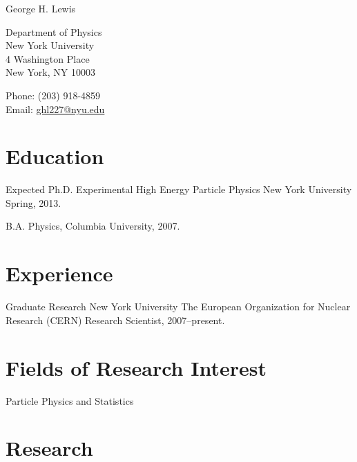 \documentclass[10pt,letterpaper]{article}
\def\name{George H. Lewis}
\renewenvironment{itemize}{
  \begin{list}{}{
    \setlength{\leftmargin}{1.5em}
    \setlength{\itemsep}{0.25em}
    \setlength{\parskip}{0pt}
    \setlength{\parsep}{0.25em}
  }
}{
  \end{list}
}
\begin{document}
{\huge \name}


\bigskip

\begin{minipage}[t]{0.495\textwidth}
  Department of Physics \\
  New York University \\
  4 Washington Place \\
  New York, NY 10003
\end{minipage}
\begin{minipage}[t]{0.495\textwidth}
  Phone: (203) 918-4859 \\
  Email: \href{mailto:ghl227@nyu.edu}{ghl227@nyu.edu} \\
\end{minipage}

\section*{Education}


\begin{itemize}
  \item Expected Ph.D. Experimental High Energy Particle Physics
    New York University
    Spring, 2013.
  \item B.A. Physics,
    Columbia University, 2007.
\end{itemize}


\section*{Experience}

\begin{itemize}

\item Graduate Research
  New York University
  The European Organization for Nuclear Research (CERN)
  Research Scientist, 2007--present.
\end{itemize}


\section*{Fields of Research Interest}

Particle Physics and Statistics

\section*{Research}
\end{document}
